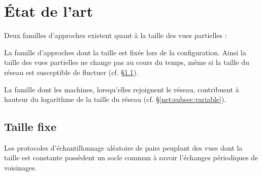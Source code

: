 
\section{État de l'art}
\label{net:sec:stateoftheart}
Deux familles d'approches existent quant à la taille des vues partielles :
\begin{inparaenum}[(i)]
\item La famille d'approches dont la taille est fixée lors de la
  configuration. Ainsi la taille des vues partielles ne change pas au cours du
  temps, même si la taille du réseau est susceptible de fluctuer
  (cf. §\ref{net:subsec:fixed}).
\item La famille dont les machines, lorsqu'elles rejoignent le réseau,
  contribuent à hauteur du logarithme de la taille du réseau
  (cf. §\ref{net:subsec:variable}).
\end{inparaenum}

\subsection{Taille fixe}
\label{net:subsec:fixed}

Les protocoles d'échantillonnage aléatoire de pairs peuplant des vues dont la
taille est constante possèdent un socle commun à savoir l'échanges périodiques
de voisinages.

